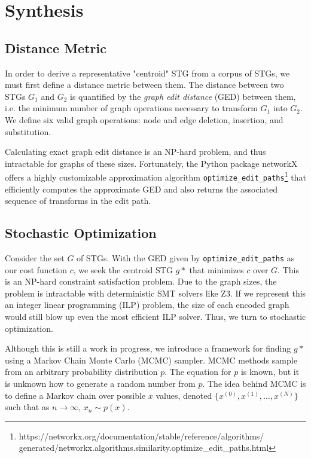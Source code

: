 \documentclass{article}
\begin{document}
\section{Synthesis}\label{sec:synthesis}
\subsection{Distance Metric}\label{subsec:dist_metric}
In order to derive a representative "centroid" STG from a corpus of STGs, we must first define a distance metric between them. The distance between two STGs $G_1$ and $G_2$ is quantified by the \textit{graph edit distance} (GED) between them, i.e. the minimum number of graph operations necessary to transform $G_1$ into $G_2$. We define six valid graph operations: node and edge deletion, insertion, and substitution. 

Calculating exact graph edit distance is an NP-hard problem, and thus intractable for graphs of these sizes. Fortunately, the Python package networkX offers a highly customizable approximation algorithm \verb!optimize_edit_paths!\footnote{https://networkx.org/documentation/stable/reference/algorithms/ generated/networkx.algorithms.similarity.optimize\_edit\_paths.html} that efficiently computes the approximate GED and also returns the associated sequence of transforms in the edit path. 

\subsection{Stochastic Optimization}\label{subsec:stoch_opt}
Consider the set $G$ of STGs. With the GED given by \verb!optimize_edit_paths! as our cost function $c$, we seek the centroid STG $g*$ that minimizes $c$ over $G$. This is an NP-hard constraint satisfaction problem. Due to the graph sizes, the problem is intractable with deterministic SMT solvers like Z3. If we represent this an integer linear programming (ILP) problem, the size of each encoded graph would still blow up even the most efficient ILP solver. Thus, we turn to stochastic optimization. 

Although this is still a work in progress, we introduce a framework for finding $g*$ using a Markov Chain Monte Carlo (MCMC) sampler. MCMC methods sample from an arbitrary probability distribution $p$. The equation for $p$ is known, but it is unknown how to generate a random number from $p$. The idea behind MCMC is to define a Markov chain over possible $x$ values, denoted $\{x^{(0)}, x^{(1)}, \ldots, x^{(N)}\}$ such that as $n \to \infty$, $x_n \sim p(x)$. 
\end{document}
